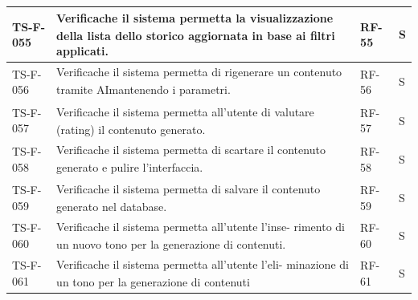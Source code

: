 \documentclass[a4paper,11pt]{article}
\renewcommand{\G}{\texorpdfstring{\textsubscript{\scalebox{0.6}{\textbf{G}}}\xspace}{ G}}
\begin{document}
\begin{longtable}{|p{2.2cm}|p{8.3cm}|p{2cm}|p{1.5cm}|}
TS-F-055 & Verifica\G che il sistema permetta la visualizzazione della lista dello
storico aggiornata in base ai filtri applicati. & RF-55 & S \\ \hline
TS-F-056 & Verifica\G che il sistema permetta di rigenerare un contenuto tramite AI\G mantenendo i
parametri. & RF-56 & S \\ \hline
TS-F-057 & Verifica\G che il sistema permetta all’utente di
valutare (rating) il contenuto generato. & RF-57 & S \\ \hline
TS-F-058 & Verifica\G che il sistema permetta di scartare il
contenuto generato e pulire l’interfaccia\G. & RF-58 & S \\ \hline
TS-F-059 & Verifica\G che il sistema permetta di salvare il
contenuto generato nel database. & RF-59 & S \\ \hline
TS-F-060 & Verifica\G che il sistema permetta all’utente l’inse-
rimento di un nuovo tono per la generazione
di contenuti. & RF-60 & S \\ \hline
TS-F-061 & Verifica\G che il sistema permetta all’utente l’eli-
minazione di un tono per la generazione di
contenuti & RF-61 & S \\ \hline


\end{longtable}
\end{document}
